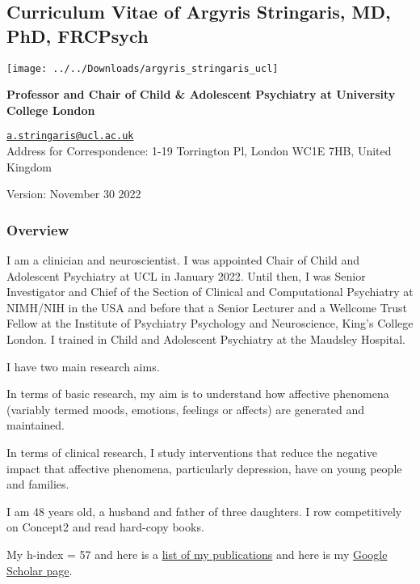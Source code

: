\documentclass[
]{article}
\author{}
\date{\vspace{-2.5em}}
\begin{document}
\hypertarget{curriculum-vitae-of-argyris-stringaris-md-phd-frcpsych}{%
\subsection{Curriculum Vitae of Argyris Stringaris, MD, PhD,
FRCPsych}\label{curriculum-vitae-of-argyris-stringaris-md-phd-frcpsych}}

\begin{flushright}\texttt{[image: ../../Downloads/argyris\_stringaris\_ucl]} \end{flushright}

\textbf{Professor and Chair of Child \& Adolescent Psychiatry at
University College London}

\href{mailto:a.stringaris@ucl.ac.uk}{\nolinkurl{a.stringaris@ucl.ac.uk}}\\
Address for Correspondence: 1-19 Torrington Pl, London WC1E 7HB, United
Kingdom

Version: November 30 2022

\hypertarget{overview}{%
\subsubsection{Overview}\label{overview}}

I am a clinician and neuroscientist. I was appointed Chair of Child and
Adolescent Psychiatry at UCL in January 2022. Until then, I was Senior
Investigator and Chief of the Section of Clinical and Computational
Psychiatry at NIMH/NIH in the USA and before that a Senior Lecturer and
a Wellcome Trust Fellow at the Institute of Psychiatry Psychology and
Neuroscience, King's College London. I trained in Child and Adolescent
Psychiatry at the Maudsley Hospital.

I have two main research aims.

In terms of basic research, my aim is to understand how affective
phenomena (variably termed moods, emotions, feelings or affects) are
generated and maintained.

In terms of clinical research, I study interventions that reduce the
negative impact that affective phenomena, particularly depression, have
on young people and families.

I am 48 years old, a husband and father of three daughters. I row
competitively on Concept2 and read hard-copy books.

My h-index = 57 and here is a
\href{https://pubmed.ncbi.nlm.nih.gov/?term=stringaris+a\&sort=date}{list
of my publications} and here is my
\href{https://scholar.google.com/citations?user=9B82424AAAAJ\&hl=en\&oi=ao}{Google
Scholar page}.
\end{document}
